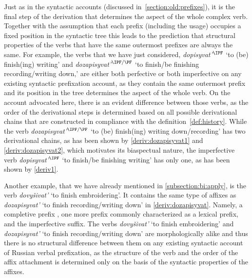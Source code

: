 Just as in the syntactic accounts (discussed in~\ref{section:old:prefixes}), it is the final step of the derivation that determines the aspect of the whole complex verb. Together with the assumption that each prefix (including the usage) occupies a fixed position in the syntactic tree this leads to the prediction that structural properties of the verbs that have the same outermost prefixes are always the same. For example, the verbs that we have just considered, \textit{dopisyvat'}$^\IPF$ `to (be) finish(ing) writing' and \textit{dozapisyvat'}$^{\IPF/\PF}$ `to finish/be finishing recording/writing down,' are either both perfective or both imperfective on any existing syntactic prefixation account, as they contain the same outermost prefix  and its position in the tree determines the aspect of the whole verb. On the account advocated here, there is an evident difference between those verbs, as the order of the derivational steps is determined based on all possible derivational chains that are constructed in compliance with the definition~\ref{def:history}. While the verb \textit{dozapisyvat'}$^{\IPF/\PF}$ `to (be) finish(ing) writing down/recording' has two derivational chains, as has been shown by \ref{deriv:dozapisyvat1} and \ref{deriv:dozapisyvat2}, which motivates its biaspectual nature, the imperfective verb \textit{dopisyvat'}$^\IPF$ `to finish/be finishing writing' has only one, as has been shown by \ref{deriv1}.

Another example, that we have already mentioned in \ref{subsection:bi:apply}, is the verb \textit{dovy\v{s}ivat'} `to finish embroidering'. It contains the same type of affixes as \textit{dozapisyvat'} `to finish recording/writing down' in \ref{deriv:dozapisyvat}. Namely, a completive prefix , one more prefix commonly characterized as a lexical prefix, and the imperfective suffix. The verbs \textit{dovy\v{s}ivat'} `to finish embroidering' and \textit{dozapisyvat'} `to finish recording/writing down' are morphologically alike and thus there is no structural difference between them on any existing syntactic account of Russian verbal prefixation, as the structure of the verb and the order of the affix attachment is determined only on the basis of the syntactic properties of the affixes.
 
